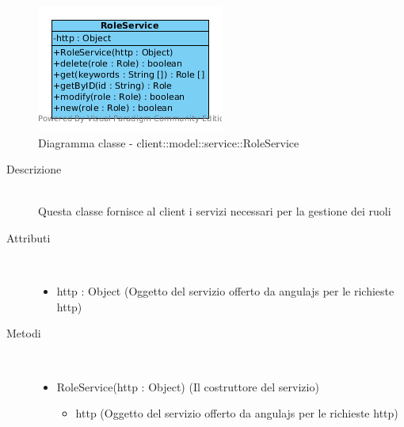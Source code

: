 \vspace{0.5cm}
\hypertarget{client::model::service::RoleService}{}
\begin{center}
			\begin{figure}[H]
				\centering \includegraphics[scale=4, max width=\textwidth, max height=\myheight]{../img/diagrammiClassi/client/model/service/RoleService.png}
				\caption{Diagramma classe - client::model::service::RoleService}
			\end{figure}
		\end{center}\begin{description}
\item[Descrizione] \hfill \\
 Questa classe fornisce al client i servizi necessari per la gestione dei ruoli
\item[Attributi] \hfill \\
 \vspace{-7mm}
\begin{itemize}
\item http : Object (Oggetto del servizio offerto da angulajs per le richieste http)
\end{itemize}

\item[Metodi] \hfill \\
 \vspace{-7mm}
\begin{itemize}
\item RoleService(http : Object) (Il costruttore del servizio)\begin{itemize}
\item http (Oggetto del servizio offerto da angulajs per le richieste http)
\end{itemize}


\end{itemize}
\end{description}

